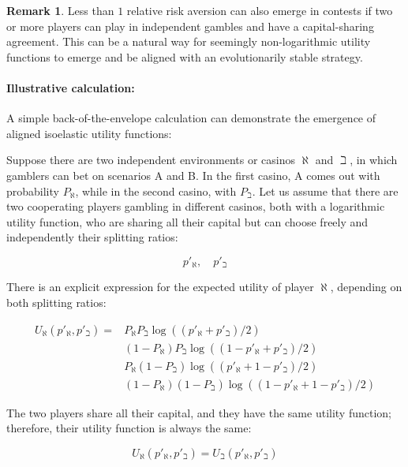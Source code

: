 \documentclass{article}
\theoremstyle{definition}
\newtheorem*{remark}{Remark}
\begin{document}
\begin{remark}
    Less than $1$ relative risk aversion can also emerge in contests if two or more players can play in independent gambles and have a capital-sharing agreement.
    This can be a natural way for seemingly non-logarithmic utility functions to emerge and be aligned with an evolutionarily stable strategy.
    
\end{remark}

\paragraph{Illustrative calculation:}

A simple back-of-the-envelope calculation can demonstrate the emergence of aligned isoelastic utility functions:

Suppose there are two independent environments or casinos $\aleph$ and $\beth$, in which gamblers can bet on scenarios A and B.
In the first casino, A comes out with probability $P_\aleph$, while in the second casino, with $P_\beth$.
Let us assume that there are two cooperating players gambling in different casinos, both with a logarithmic utility function, who are sharing all their capital but can choose freely and independently their splitting ratios:

\begin{equation}
    p'_\aleph, \quad p'_\beth
\end{equation}

There is an explicit expression for the expected utility of player $\aleph$, depending on both splitting ratios:

\begin{equation}
\begin{split}
    U_\aleph(p'_\aleph, p'_\beth) = 
    &P_\aleph P_\beth \log ((p'_\aleph + p'_\beth)/2) \\
    &(1-P_\aleph) P_\beth \log ((1-p'_\aleph + p'_\beth)/2) \\
    &P_\aleph (1-P_\beth) \log ((p'_\aleph + 1 - p'_\beth)/2) \\
    &(1-P_\aleph) (1-P_\beth) \log ((1-p'_\aleph + 1- p'_\beth)/2)
\end{split}
\end{equation}

The two players share all their capital, and they have the same utility function; therefore, their utility function is always the same:

\begin{equation}
    U_\aleph(p'_\aleph, p'_\beth) =
    U_\beth(p'_\aleph, p'_\beth) 
\end{equation}
\end{document}
